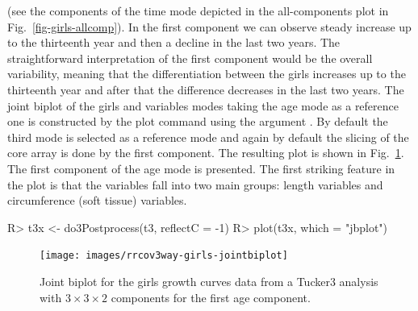 \documentclass[article,shortnames, nojss]{jss}
\begin{document}
(see the components of the time mode depicted in the all-components plot in
Fig.~\ref{fig-girls-allcomp}). In the first component we can observe steady
increase up to the thirteenth year and then a decline in the last two years.
The straightforward interpretation of the first component would be the overall
variability, meaning that the differentiation between the girls increases
up to the thirteenth year and after that the difference decreases in the
last two years. The joint biplot of the girls and variables modes taking
the age mode as a reference one is constructed by the plot command using
the argument . By default the third mode is selected
as a reference mode and again by default the slicing of the core array
is done by the first component.
The resulting plot is shown in Fig.~\ref{fig-girls-jointbiplot}.
The first component of the age mode is presented. The first striking feature
in the plot is that the variables fall into two main groups: length variables
and circumference (soft tissue) variables.
\begin{Schunk}
\begin{Sinput}
R> t3x <- do3Postprocess(t3, reflectC = -1)
R> plot(t3x, which = "jbplot")
\end{Sinput}
\end{Schunk}
\begin{figure}
\centering
\texttt{[image: images/rrcov3way-girls-jointbiplot]}
\caption{Joint  biplot for the girls growth curves data from a Tucker3
analysis with $3\times3\times2$ components for the first age component.}
\label{fig-girls-jointbiplot}
\end{figure}
\end{document}
